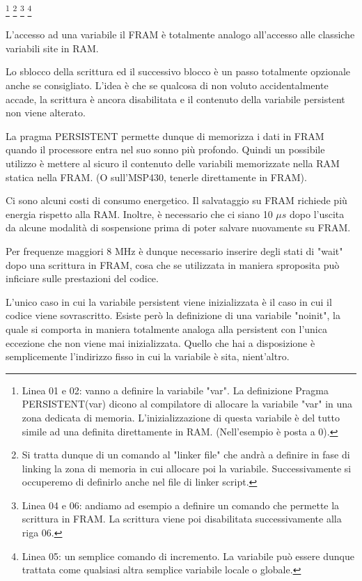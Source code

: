 \documentclass[LaM,binding=0.6cm]{../sapthesis}
\begin{document}
\footnote{
Linea 01 e 02: vanno a definire la variabile "var". La definizione Pragma PERSISTENT(var) dicono al compilatore di allocare la variabile "var" in una zona dedicata di memoria. L'inizializzazione di questa variabile è del tutto simile ad una definita direttamente in RAM. (Nell'esempio è posta a 0).
}
\footnote{
Si tratta dunque di un comando al "linker file" che andrà a definire in fase di linking la zona di memoria in cui allocare poi la variabile. Successivamente si occuperemo di definirlo anche nel file di linker script.}
\footnote{
Linea 04 e 06: andiamo ad esempio a definire un comando che permette la scrittura in FRAM. La scrittura viene poi disabilitata successivamente alla riga 06.
}
\footnote{
Linea 05: un semplice comando di incremento. La variabile può essere dunque trattata come qualsiasi altra semplice variabile locale o globale.
}

\clearpage
L'accesso ad una variabile il FRAM è totalmente analogo all'accesso alle classiche variabili site in RAM.

Lo sblocco della scrittura ed il successivo blocco è un passo totalmente opzionale anche se consigliato. L'idea è che se qualcosa di non voluto accidentalmente accade, la scrittura è ancora disabilitata e il contenuto della variabile persistent non viene alterato.

La pragma PERSISTENT permette dunque di memorizza i dati in FRAM quando il processore entra nel suo sonno più profondo.
Quindi un possibile utilizzo è mettere al sicuro il contenuto delle variabili memorizzate nella RAM statica nella FRAM. (O sull'MSP430, tenerle direttamente in FRAM).

Ci sono alcuni costi di consumo energetico. Il salvataggio su FRAM richiede più energia rispetto alla RAM. Inoltre, è necessario che ci siano 10 $\mu s$ dopo l'uscita da alcune modalità di sospensione prima di poter salvare nuovamente su FRAM.

Per frequenze maggiori 8 MHz è dunque necessario inserire degli stati di "wait" dopo una scrittura in FRAM, cosa che se utilizzata in maniera sproposita può inficiare sulle prestazioni del codice.

L'unico caso in cui la variabile persistent viene inizializzata è il caso in cui il codice viene sovrascritto.
Esiste però la definizione di una variabile "noinit", la quale si comporta in maniera totalmente analoga alla persistent con
l'unica eccezione che non viene mai inizializzata.
Quello che hai a disposizione è semplicemente l'indirizzo fisso in cui la variabile è sita, nient'altro.
\end{document}
